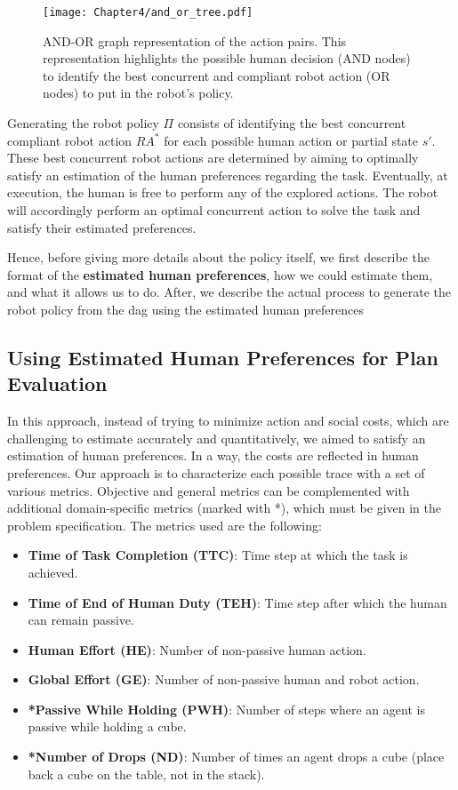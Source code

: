 \begin{figure}[h]
    \texttt{[image: Chapter4/and\_or\_tree.pdf]}
    \caption{AND-OR graph representation of the action pairs. 
    This representation highlights the possible human decision (AND nodes) to identify the best concurrent and compliant robot action (OR nodes) to put in the robot's policy. 
    }
    \label{fig:and_or}
\end{figure}


Generating the robot policy $\Pi$ consists of identifying the best concurrent compliant robot action $RA^*$ for each possible human action or partial state $s'$. These best concurrent robot actions are determined by aiming to optimally satisfy an estimation of the human preferences regarding the task. Eventually, at execution, the human is free to perform any of the explored actions. The robot will accordingly perform an optimal concurrent action to solve the task and satisfy their estimated preferences.

Hence, before giving more details about the policy itself, we first describe the format of the \textbf{estimated human preferences}, how we could estimate them, and what it allows us to do. After, we describe the actual process to generate the robot policy from the \acrshort{dag} using the estimated human preferences


    \subsection{Using Estimated Human Preferences for Plan Evaluation}

In this approach, instead of trying to minimize action and social costs, which are challenging to estimate accurately and quantitatively, we aimed to satisfy an estimation of human preferences. In a way, the costs are reflected in human preferences. Our approach is to characterize each possible trace with a set of various metrics. Objective and general metrics can be complemented with additional domain-specific metrics (marked with *), which must be given in the problem specification. The metrics used are the following:

\begin{itemize}
    \item \textbf{Time of Task Completion (TTC)}: Time step at which the task is achieved.
    \item \textbf{Time of End of Human Duty (TEH)}: Time step after which the human can remain passive.
    \item \textbf{Human Effort (HE)}: Number of non-passive human action.
    \item \textbf{Global Effort (GE)}: Number of non-passive human and robot action.
    \item \textbf{*Passive While Holding (PWH)}: Number of steps where an agent is passive while holding a cube.
    \item \textbf{*Number of Drops (ND)}: Number of times an agent drops a cube (place back a cube on the table, not in the stack).
\end{itemize}


